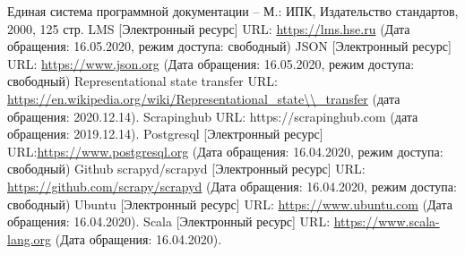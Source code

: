 \documentclass[a4paper,12pt,reqno]{article}
\begin{document}
						\newpage
	\begin{thebibliography}{3}
		Единая система программной документации – М.: ИПК, Издательство стандартов, 2000, 125 стр.
		LMS [Электронный ресурс] URL: 
		\url{https://lms.hse.ru} (Дата обращения: 16.05.2020, режим доступа: свободный)
		 JSON [Электронный ресурс] URL: \url{https://www.json.org} (Дата обращения: 16.05.2020, режим доступа: свободный)
		 Representational state transfer URL: \url{https://en.wikipedia.org/wiki/Representational\_state\\\_transfer} (дата обращения: 2020.12.14).
		 Scrapinghub URL: https://scrapinghub.com (дата обращения: 2019.12.14).
		 Postgresql [Электронный ресурс] URL:\url{https://www.postgresql.org} (Дата обращения: 16.04.2020, режим доступа: свободный)
		 Github scrapyd/scrapyd [Электронный ресурс] URL: \url{https://github.com/scrapy/scrapyd} (Дата обращения: 16.04.2020, режим доступа: свободный)
		 Ubuntu [Электронный ресурс] URL: \url{https://www.ubuntu.com} (Дата обращения: 16.04.2020).
		 Scala [Электронный ресурс] URL: \url{https://www.scala-lang.org} (Дата обращения: 16.04.2020).
		
	\end{thebibliography}

						\newpage
	\listRegistration
\end{document}
